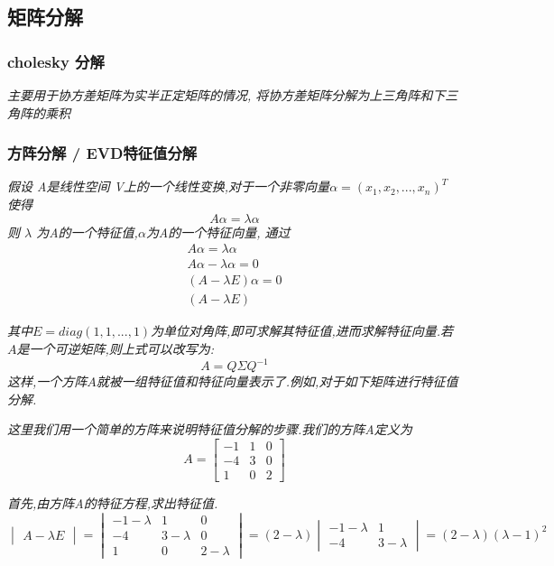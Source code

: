 \documentclass{scrartcl}
\numberwithin{equation}{section}   %
\begin{document}
\subsection{矩阵分解}
\subsubsection{cholesky 分解}
\textsl{
    主要用于协方差矩阵为实半正定矩阵的情况, 将协方差矩阵分解为上三角阵和下三角阵的乘积 
}
\subsubsection{方阵分解 / EVD特征值分解}

\textsl{
    假设 A是线性空间 V上的一个线性变换,对于一个非零向量$\alpha = (x_1, x_2, ... , x_n)^T$ 使得}
\begin{equation}
    A\alpha = \lambda \alpha
\end{equation}
\textsl{
    则 $\lambda$ 为A的一个特征值,$\alpha$为A的一个特征向量, 通过}
\begin{equation}
    \begin{aligned}
        A\alpha = \lambda \alpha     \\
        A\alpha - \lambda \alpha = 0 \\
        (A - \lambda E) \alpha = 0   \\
        (A - \lambda E)
    \end{aligned}
\end{equation}

\textsl{
    其中$E = diag(1,1,...,1)$为单位对角阵,即可求解其特征值,进而求解特征向量.若$A$是一个可逆矩阵,则上式可以改写为:
    $$A = Q \Sigma Q^{-1}$$这样,一个方阵$A$就被一组特征值和特征向量表示了.例如,对于如下矩阵进行特征值分解.
}


\textsl{
    这里我们用一个简单的方阵来说明特征值分解的步骤.我们的方阵A定义为}
\[A=\left[ \begin{array}{ccc}
            -1 & 1 & 0 \\
            -4 & 3 & 0 \\
            1  & 0 & 2
        \end{array}
        \right ]\]

\textsl{
    首先,由方阵A的特征方程,求出特征值.
}
\[
    \begin{vmatrix} A -\lambda E \end{vmatrix}
    = \begin{vmatrix}
        -1-\lambda & 1           & 0           \\
        -4         & 3 - \lambda & 0           \\
        1          & 0           & 2 - \lambda
    \end{vmatrix} = (2-\lambda)\begin{vmatrix} -1-\lambda & 1 \\ -4 & 3-\lambda
    \end{vmatrix} = (2-\lambda) (\lambda -1)^2
\]
\end{document}
